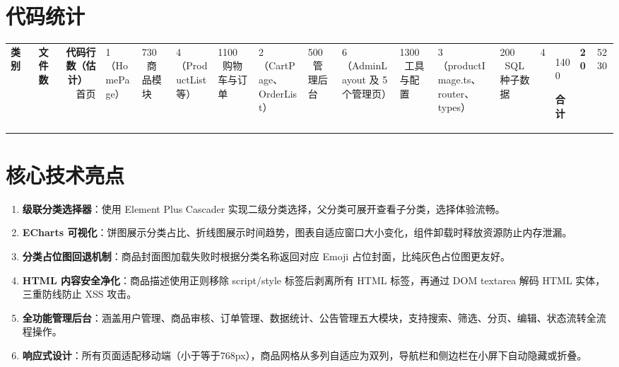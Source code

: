 \documentclass[12pt,a4paper]{ctexart}
\begin{document}
\section{代码统计}

\begin{table}[H]
\centering
\begin{tabular}{lrr}
\toprule
\textbf{类别} & \textbf{文件数} & \textbf{代码行数（估计）} \
\midrule
首页 & 1（HomePage） & 730 \
商品模块 & 4（ProductList 等） & 1100 \
购物车与订单 & 2（CartPage、OrderList） & 500 \
管理后台 & 6（AdminLayout 及 5 个管理页） & 1300 \
工具与配置 & 3（productImage.ts、router、types） & 200 \
SQL 种子数据 & 4 & 1400 \
\textbf{合计} & \textbf{20} & 5230 \
\bottomrule
\end{tabular}
\end{table}

\section{核心技术亮点}

\begin{enumerate}
    \item \textbf{级联分类选择器}：使用 Element Plus Cascader 实现二级分类选择，父分类可展开查看子分类，选择体验流畅。
    \item \textbf{ECharts 可视化}：饼图展示分类占比、折线图展示时间趋势，图表自适应窗口大小变化，组件卸载时释放资源防止内存泄漏。
    \item \textbf{分类占位图回退机制}：商品封面图加载失败时根据分类名称返回对应 Emoji 占位封面，比纯灰色占位图更友好。
    \item \textbf{HTML 内容安全净化}：商品描述使用正则移除 script/style 标签后剥离所有 HTML 标签，再通过 DOM textarea 解码 HTML 实体，三重防线防止 XSS 攻击。
    \item \textbf{全功能管理后台}：涵盖用户管理、商品审核、订单管理、数据统计、公告管理五大模块，支持搜索、筛选、分页、编辑、状态流转全流程操作。
    \item \textbf{响应式设计}：所有页面适配移动端（小于等于768px），商品网格从多列自适应为双列，导航栏和侧边栏在小屏下自动隐藏或折叠。
\end{enumerate}
\end{document}
